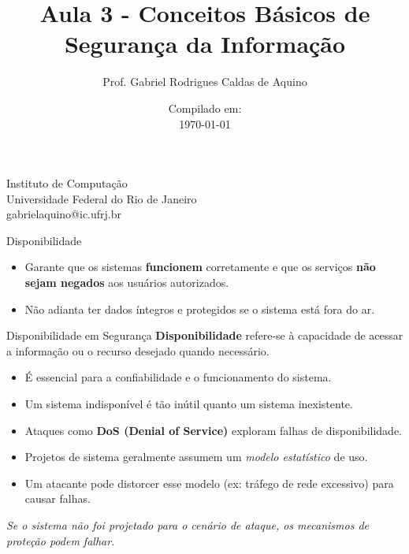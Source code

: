 \title{Aula 3 - Conceitos Básicos de Segurança da Informação}

\author{Prof. Gabriel Rodrigues Caldas de Aquino}

\institute
{
    Instituto de Computação \\
    Universidade Federal do Rio de Janeiro\\
    gabrielaquino@ic.ufrj.br %
}
\date{Compilado em: \\ \today} %



\begin{frame}
    \titlepage
\end{frame}




\begin{frame}{Disponibilidade}
    \begin{itemize}
        \item  Garante que os sistemas \textbf{funcionem} corretamente e que os serviços \textbf{não sejam negados} aos usuários autorizados.


        \item Não adianta ter dados íntegros e protegidos se o sistema está fora do ar.
    \end{itemize}



\end{frame}



\begin{frame}{Disponibilidade em Segurança}
    \textbf{Disponibilidade} refere-se à capacidade de acessar a informação ou o recurso desejado quando necessário.

    \vspace{0.5cm}
    \begin{itemize}
        \item É essencial para a confiabilidade e o funcionamento do sistema.
        \item Um sistema indisponível é tão inútil quanto um sistema inexistente.
        \item Ataques como \textbf{DoS (Denial of Service)} exploram falhas de disponibilidade.
        \item Projetos de sistema geralmente assumem um \textit{modelo estatístico} de uso.
        \item Um atacante pode distorcer esse modelo (ex: tráfego de rede excessivo) para causar falhas.
    \end{itemize}

    \vspace{0.5cm}
    \textit{Se o sistema não foi projetado para o cenário de ataque, os mecanismos de proteção podem falhar.}
\end{frame}

